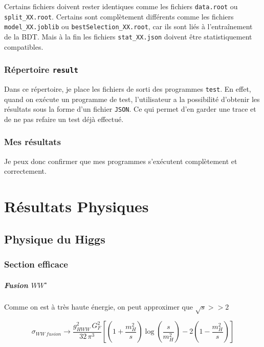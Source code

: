 \documentclass[10pt,a4paper]{report}
\newcommand{\Wstar}{W^{\star}}
\begin{document}
Certains fichiers doivent rester identiques comme les fichiers \verb|data.root| ou \verb|split_XX.root|. Certains sont complètement différents comme les fichiers \verb|model_XX.joblib| ou \verb|bestSelection_XX.root|, car ils sont liés à l'entraînement de la BDT. Mais à la fin les fichiers \verb|stat_XX.json| doivent être statistiquement compatibles.

\subsection{Répertoire \texttt{result}}

Dans ce répertoire, je place les fichiers de sorti des programmes \texttt{test}. 
En effet, quand on exécute un programme de test, l'utilisateur a la possibilité d'obtenir les résultats sous la forme d'un fichier \texttt{JSON}. 
Ce qui permet d'en garder une trace et de ne pas refaire un test déjà effectué.\\

\subsection{Mes résultats}

Je peux donc confirmer que mes programmes s'exécutent complètement et correctement.


\chapter{Résultats Physiques}

\section{Physique du Higgs}

\subsection{Section efficace}

\paragraph{Fusion $W\Wstar$ \cite{desy}}

Comme on est à très haute énergie, on peut approximer que $ \sqrt{s} >> 2 $

\begin{equation}
	\sigma_{WW\ fusion} \longrightarrow 
		\frac{g_{HWW}^2 \, G_F^2}{32 \, \pi^3}
		\left[
			\left(1 + \frac{m_H^2}{s}\right) \log\left(\frac{s}{m_H^2}\right)
			- 2 \left(1 - \frac{m_H^2}{s}\right)
		\right]
\end{equation}
\end{document}
